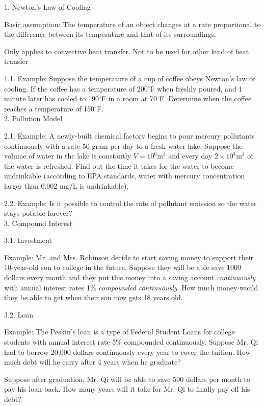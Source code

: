 \documentclass[11pt]{article}
\begin{document}
1. Newton's Law of Cooling

Basic assumption: The temperature of an object changes at a rate proportional to the difference between its temperature and that of its surroundings. 

Only applies to convective heat transfer. Not to be used for other kind of heat transfer


1.1. Example: Suppose the temperature of a cup of coffee obeys Newton's law of cooling. If the coffee has a temperature of 200$^\circ$F when freshly poured, and 1 minute later has cooled to 190$^\circ$F in a room at 70$^\circ$F. Determine when the coffee reaches a temperature of 150$^\circ$F. \\

2. Pollution Model

2.1. Example: A newly-built chemical factory begins to pour mercury pollutants continuously with a rate $50$ gram per day to a fresh water lake. Suppose the volume of water in the lake is constantly $V=10^6$m$^3$ and every day $2\times 10^4$m$^3$ of the water is refreshed. Find out the time it takes for the water to become undrinkable (according to EPA standards, water with mercury concentration larger than 0.002 mg/L is undrinkable). 

2.2. Example: Is it possible to control the rate of pollutant emission so the water stays potable forever? \\

3. Compound Interest

3.1. Investment

Example: Mr. and Mrs. Robinson decide to start saving money to support their 10-year-old son to college in the future. Suppose they will be able save 1000 dollars every month and they put this money into a saving account \textit{continuously} with annual interest rates 1\% \textit{compounded continuously}. How much money would they be able to get when their son now gets 18 years old. 

3.2. Loan

Example: The Peskin's loan is a type of Federal Student Loans for college students with annual interest rate 5\% compounded continuously. Suppose Mr. Qi had to borrow 20,000 dollars continuously every year to cover the tuition. How much debt will he carry after 4 years when he graduate?

Suppose after graduation, Mr. Qi will be able to save 500 dollars per month to pay his loan back. How many years will it take for Mr. Qi to finally pay off his debt? \\
\end{document}
